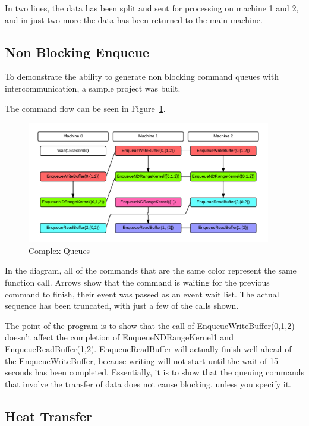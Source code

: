 \documentclass[../thesis.tex]{subfiles}
\begin{document}
In two lines, the data has been split and sent for processing on machine 1 and 2, and in just two more the data has been returned to the main machine.

\subsection{Non Blocking Enqueue} %
\label{sub:non_blocking_enqueue}
To demonstrate the ability to generate non blocking command queues with intercommunication, a sample project was built.

The command flow can be seen in Figure~\ref{fig:complex_queue}.

\begin{figure}[htbp]
    \centering
    \includegraphics[width=0.95\textwidth]{diagrams/complex_queue.png}
    \caption{Complex Queues}
    \label{fig:complex_queue}
\end{figure}

In the diagram, all of the commands that are the same color represent the same function call. Arrows show that the command is waiting for the previous command to finish, their event was passed as an event wait list. The actual sequence has been truncated, with just a few of the calls shown.

The point of the program is to show that the call of EnqueueWriteBuffer(0,{1,2}) doesn't affect the completion of EnqueueNDRangeKernel{1} and EnqueueReadBuffer(1,{2}). EnqueueReadBuffer will actually finish well ahead of the EnqueueWriteBuffer, because writing will not start until the wait of 15 seconds has been completed. Essentially, it is to show that the queuing commands that involve the transfer of data does not cause blocking, unless you specify it.

\subsection{Heat Transfer} %
\label{sub:heat_transfer} 
\end{document}

